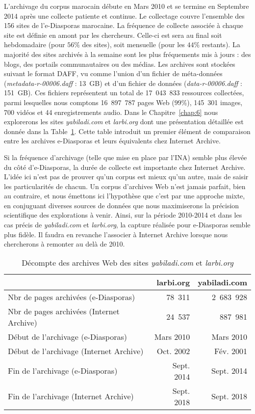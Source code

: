 \documentclass[symmetric,justified,marginals=raggedouter]{tufte-book}
\begin{document}
L'archivage du corpus marocain débute en Mars 2010 et se termine en Septembre 2014 après une collecte patiente et continue. Le collectage couvre l'ensemble des 156 sites de l'e-Diasporas marocaine. La fréquence de collecte associée à chaque site est définie en amont par les chercheurs. Celle-ci est sera au final soit hebdomadaire (pour $56\%$ des sites), soit mensuelle (pour les $44\%$ restants). La majorité des sites archivés à la semaine sont les plus fréquements mis à jours : des blogs, des portails communautaires ou des médias. Les archives sont stockées suivant le format DAFF, vu comme l'union d'un fichier de méta-données (\textit{metadata-r-00006.daff} : 13~GB) et d'un fichier de données (\textit{data-r-00006.daff} : 151~GB). Ces fichiers représentent un total de 17~043~833 ressources collectées, parmi lesquelles nous comptons 16~897~787 pages Web ($99\%$), 145~301 images, 700 vidéos et 44 enregistrements audio. Dans le Chapitre~\ref{chap:6} nous explorerons les sites \textit{yabiladi.com} et \textit{larbi.org} dont une présentation détaillée est donnée dans la Table~\ref{tab:detail-archive}. Cette table introduit un premier élément de comparaison entre les archives e-Diasporas et leurs équivalents chez Internet Archive.

Si la fréquence d'archivage (telle que mise en place par l'INA) semble plus élevée du côté d'e-Diasporas, la durée de collecte est importante chez Internet Archive. L'idée ici n'est pas de prouver qu'un corpus est mieux qu'un autre, mais de saisir les particularités de chacun. Un corpus d'archives Web n'est jamais parfait, bien au contraire, et nous émettons ici l'hypothèse que c'est par une approche mixte, en conjuguant diverses sources de données que nous maximiserons la précision scientifique des explorations à venir. Ainsi, sur la période 2010-2014 et dans les cas précis de \textit{yabiladi.com} et \textit{larbi.org}, la capture réalisée pour e-Diasporas semble plus fidèle. Il faudra en revanche l'associer à Internet Archive lorsque nous chercherons à remonter au delà de 2010.

\newpage 

\begin{table}
\centering
  \label{tab:detail-archive}
  \begin{tabular}{lrr}
    \toprule
    &larbi.org&yabiladi.com\\
    \midrule
    Nbr de pages archivées (e-Diasporas)  & 78~311 & 2~683~928\\
    Nbr de pages archivées (Internet Archive) & 24~537 & 887~981\\
    \midrule
    Début de l'archivage  (e-Diasporas) & Mars 2010 & Mars 2010\\
    Début de l'archivage  (Internet Archive) & Oct. 2002 & Fév. 2001\\
    \midrule
    Fin de l'archivage  (e-Diasporas) & Sept. 2014 & Sept. 2014\\
    Fin de l'archivage  (Internet Archive) & Sept. 2018 & Sept. 2018\\    
  \bottomrule
\end{tabular}
  \bigskip
  \caption{Décompte des archives Web des sites \textit{yabiladi.com} et \textit{larbi.org}}
\end{table} 
\end{document}
